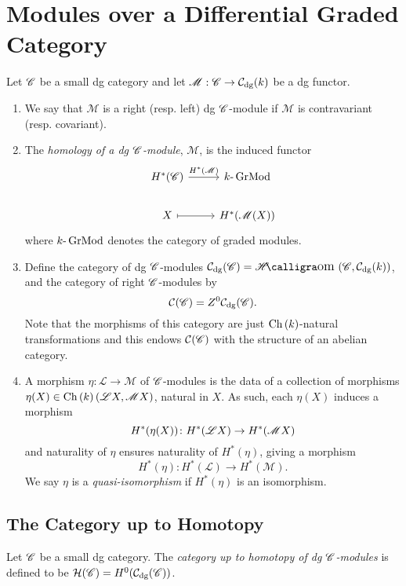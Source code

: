 \documentclass[dissertation.tex]{subfiles}
\begin{document}
\section{Modules over a Differential Graded Category}

\begin{defn}
  Let $\mathscr{C}$ be a small dg category and let $\mathscr{M} : \mathscr{C} \rightarrow \mathcal{C}_\text{dg}(k)$ be a dg functor.
  \begin{enumerate}
  \item
    We say that $\mathscr{M}$ is a right (resp. left) dg $\mathscr{C}$-module if $\mathscr{M}$ is contravariant (resp. covariant).
  \item
    The {\it homology of a dg $\mathscr{C}$-module}, $\mathscr{M}$, is the induced functor
    $$\begin{tikzcd}
      H^\ast(\CC) \arrow{r}{H^\ast(\mathscr{M})}& \Gr{k}\\
      X \arrow[mapsto]{r} & H^\ast(\mathscr{M}(X))
    \end{tikzcd}$$
    where $k\text{-}\operatorname{GrMod}$ denotes the category of graded modules.
  \item
    Define the category of dg $\mathscr{C}$-modules $\mathcal{C}_\text{dg}(\CC) = \SHom{\CC, \mathcal{C}_\text{dg}(k)}$, and the category of right $\mathscr{C}$-modules by
    $$\mathcal{C}(\mathscr{C}) = Z^0 \mathcal{C}_\text{dg}(\mathscr{C}).$$
    Note that the morphisms of this category are just $\operatorname{Ch}\left(k\right)$-natural transformations and this endows $\mathcal{C}(\mathscr{C})$ with the structure of an abelian category.
    \item
      A morphism $\eta \colon \mathscr{L} \rightarrow \mathscr{M}$ of $\mathscr{C}$-modules is the data of a collection of morphisms $\eta(X) \in \operatorname{Ch}\left(k\right)(\mathscr{L}X,\mathscr{M}X)$, natural in $X$.
      As such, each $\eta(X)$ induces a morphism
      $$H^\ast(\eta(X)) \colon H^\ast(\mathscr{L}X) \to H^\ast(\mathscr{M}X)$$
      and naturality of $\eta$ ensures naturality of $H^\ast(\eta)$, giving a morphism
      $$H^\ast(\eta) \colon H^\ast(\mathscr{L}) \rightarrow H^\ast(\mathscr{M}).$$
      We say $\eta$ is a {\it quasi-isomorphism} if $H^\ast(\eta)$ is an isomorphism.
  \end{enumerate}
\end{defn}

\subsection{The Category up to Homotopy}
\begin{defn}
    Let $\mathscr{C}$ be a small dg category.
    The {\it category up to homotopy of dg $\mathscr{C}$-modules} is defined to be $\mathcal{H}(\mathscr{C}) = H^0(\mathcal{C}_\text{dg}(\mathscr{C}))$.
\end{defn}
\end{document}
